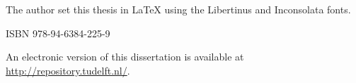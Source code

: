 \begin{titlepage}
\medskip
\medskip
\noindent The author set this thesis in \LaTeX\xspace using the Libertinus and Inconsolata fonts.

\vspace{\bigskipamount}



\noindent ISBN 978-94-6384-225-9

\medskip
\noindent An electronic version of this dissertation is available at \\
\url{http://repository.tudelft.nl/}.

\end{titlepage}

